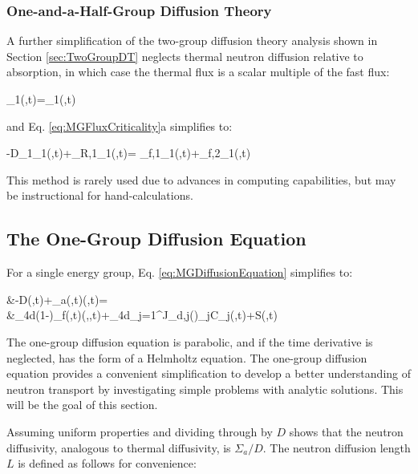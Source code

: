 \subsubsection{One-and-a-Half-Group Diffusion Theory}

A further simplification of the two-group diffusion theory analysis shown in Section \ref{sec:TwoGroupDT} neglects thermal neutron diffusion relative to absorption, in which case the thermal flux is a scalar multiple of the fast flux:

\beq
\phi_1(,t)=\phi_1(,t)
\eeq

and Eq. \eqref{eq:MGFluxCriticality}a simplifies to:

\beq
-\nabla\cdot\left\lbrack D_1\nabla\phi_1(,t)\right\rbrack+\Sigma_{R,1}\phi_1(,t)=
\left\lbrack\nu\Sigma_{f,1}\phi_1(,t)+\nu\Sigma_{f,2}\phi_1(,t)\right\rbrack\\
\eeq

This method is rarely used due to advances in computing capabilities, but may be instructional for hand-calculations.

\subsection{The One-Group Diffusion Equation}
For a single energy group, Eq. \eqref{eq:MGDiffusionEquation} simplifies to:

\beqa
\label{eq:1GDiffusionEquation}
&-\nabla\cdot\left\lbrack D\nabla\phi(,t)\right\rbrack+\Sigma_a(,t)\phi(,t)=\\
&\hspace{1cm}\int_{4\pi}d\hO(1-\beta)\nu\Sigma_f(,t)\phi(,\hO,t)+\int_{4\pi}d\hO\sum_{j=1}^J\chi_{d,j}(\hO)\lambda_jC_j(,t)+S(,t)
\eeqa

The one-group diffusion equation is parabolic, and if the time derivative is neglected, has the form of a Helmholtz equation. The one-group diffusion equation provides a convenient simplification to develop a better understanding of neutron transport by investigating simple problems with analytic solutions. This will be the goal of this section. 

Assuming uniform properties and dividing through by \(D\) shows that the neutron diffusivity, analogous to thermal diffusivity, is \(\Sigma_a/D\). The neutron diffusion length \(L\) is defined as follows for convenience:

